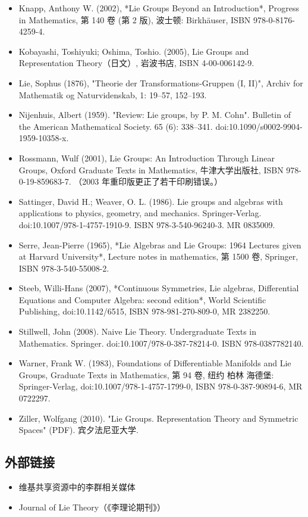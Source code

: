\begin{itemize}
\item Knapp, Anthony W. (2002), *Lie Groups Beyond an Introduction*, Progress in Mathematics, 第 140 卷 (第 2 版), 波士顿: Birkhäuser, ISBN 978-0-8176-4259-4.
\item Kobayashi, Toshiyuki; Oshima, Toshio. (2005), Lie Groups and Representation Theory（日文）, 岩波书店, ISBN 4-00-006142-9.
\item Lie, Sophus (1876), "Theorie der Transformations-Gruppen (I, II)", Archiv for Mathematik og Naturvidenskab, 1: 19–57, 152–193.
\item Nijenhuis, Albert (1959). "Review: Lie groups, by P. M. Cohn". Bulletin of the American Mathematical Society. 65 (6): 338–341. doi:10.1090/s0002-9904-1959-10358-x.
\item Rossmann, Wulf (2001), Lie Groups: An Introduction Through Linear Groups, Oxford Graduate Texts in Mathematics, 牛津大学出版社, ISBN 978-0-19-859683-7. （2003 年重印版更正了若干印刷错误。）
\item Sattinger, David H.; Weaver, O. L. (1986). Lie groups and algebras with applications to physics, geometry, and mechanics. Springer-Verlag. doi:10.1007/978-1-4757-1910-9. ISBN 978-3-540-96240-3. MR 0835009.
\item Serre, Jean-Pierre (1965), *Lie Algebras and Lie Groups: 1964 Lectures given at Harvard University*, Lecture notes in mathematics, 第 1500 卷, Springer, ISBN 978-3-540-55008-2.
\item Steeb, Willi-Hans (2007), *Continuous Symmetries, Lie algebras, Differential Equations and Computer Algebra: second edition*, World Scientific Publishing, doi:10.1142/6515, ISBN 978-981-270-809-0, MR 2382250.
\item Stillwell, John (2008). Naive Lie Theory. Undergraduate Texts in Mathematics. Springer. doi:10.1007/978-0-387-78214-0. ISBN 978-0387782140.
\item Warner, Frank W. (1983), Foundations of Differentiable Manifolds and Lie Groups, Graduate Texts in Mathematics, 第 94 卷, 纽约 柏林 海德堡: Springer-Verlag, doi:10.1007/978-1-4757-1799-0, ISBN 978-0-387-90894-6, MR 0722297.
\item Ziller, Wolfgang (2010). "Lie Groups. Representation Theory and Symmetric Spaces" (PDF). 宾夕法尼亚大学.
\end{itemize}
\subsection{外部链接}
\begin{itemize}
\item 维基共享资源中的李群相关媒体
\item Journal of Lie Theory（《李理论期刊》）
\end{itemize}